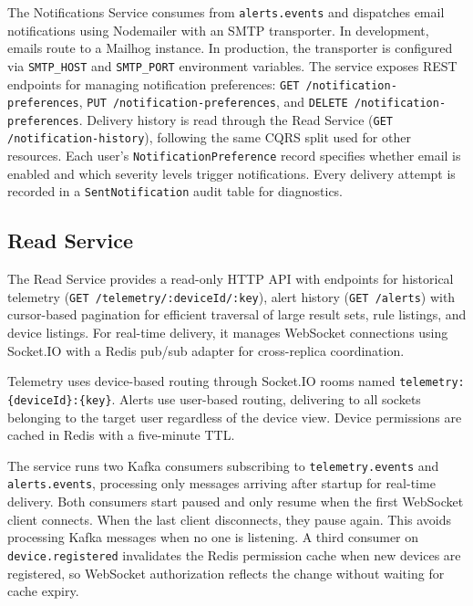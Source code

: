 The Notifications Service consumes from \texttt{alerts.events} and dispatches email notifications using Nodemailer with an \gls{SMTP} transporter. In development, emails route to a Mailhog instance. In production, the transporter is configured via \texttt{SMTP\_HOST} and \texttt{SMTP\_PORT} environment variables. The service exposes \gls{REST} endpoints for managing notification preferences: \texttt{GET /notification-preferences}, \texttt{PUT /notification-preferences}, and \texttt{DELETE /notification-preferences}. Delivery history is read through the Read Service (\texttt{GET /notification-history}), following the same \gls{CQRS} split used for other resources. Each user's \texttt{NotificationPreference} record specifies whether email is enabled and which severity levels trigger notifications. Every delivery attempt is recorded in a \texttt{SentNotification} audit table for diagnostics.

\subsection{Read Service}
\label{subsec:ReadServiceImpl}

The Read Service provides a read-only \gls{HTTP} \gls{API} with endpoints for historical telemetry (\texttt{GET /telemetry/:deviceId/:key}), alert history (\texttt{GET /alerts}) with cursor-based pagination for efficient traversal of large result sets, rule listings, and device listings. For real-time delivery, it manages WebSocket connections using Socket.IO with a Redis pub/sub adapter for cross-replica coordination.

Telemetry uses device-based routing through Socket.IO rooms named \texttt{telemetry:\{deviceId\}:\{key\}}. Alerts use user-based routing, delivering to all sockets belonging to the target user regardless of the device view. Device permissions are cached in Redis with a five-minute TTL.

The service runs two Kafka consumers subscribing to \texttt{telemetry.events} and \texttt{alerts.events}, processing only messages arriving after startup for real-time delivery. Both consumers start paused and only resume when the first WebSocket client connects. When the last client disconnects, they pause again. This avoids processing Kafka messages when no one is listening. A third consumer on \texttt{device.registered} invalidates the Redis permission cache when new devices are registered, so WebSocket authorization reflects the change without waiting for cache expiry.
